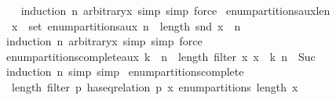 \begin{isabellebody}
%
\isadelimproof
\ \ %
\endisadelimproof
%
\isatagproof
{}\isamarkupfalse%
\ {\isacharparenleft}{\kern0pt}induction\ n\ arbitrary{\isacharcolon}{\kern0pt}x{\isacharcomma}{\kern0pt}\ simp{\isacharcomma}{\kern0pt}\ simp{\isacharcomma}{\kern0pt}\ force{\isacharparenright}{\kern0pt}%
\endisatagproof
{\isafoldproof}%
%
\isadelimproof
\isanewline
%
\endisadelimproof
\isanewline
{}\isamarkupfalse%
\ enum{\isacharunderscore}{\kern0pt}partitions{\isacharunderscore}{\kern0pt}aux{\isacharunderscore}{\kern0pt}len{\isacharcolon}{\kern0pt}\isanewline
\ \ {\isachardoublequoteopen}x\ {\isasymin}\ set\ {\isacharparenleft}{\kern0pt}enum{\isacharunderscore}{\kern0pt}partitions{\isacharunderscore}{\kern0pt}aux\ n{\isacharparenright}{\kern0pt}\ {\isasymLongrightarrow}\ length\ {\isacharparenleft}{\kern0pt}snd\ x{\isacharparenright}{\kern0pt}\ {\isacharequal}{\kern0pt}\ n{\isachardoublequoteclose}\isanewline
%
\isadelimproof
\ \ %
\endisadelimproof
%
\isatagproof
{}\isamarkupfalse%
\ {\isacharparenleft}{\kern0pt}induction\ n\ arbitrary{\isacharcolon}{\kern0pt}x{\isacharcomma}{\kern0pt}\ simp{\isacharcomma}{\kern0pt}\ simp{\isacharcomma}{\kern0pt}\ force{\isacharparenright}{\kern0pt}%
\endisatagproof
{\isafoldproof}%
%
\isadelimproof
\isanewline
%
\endisadelimproof
\isanewline
{}\isamarkupfalse%
\ enum{\isacharunderscore}{\kern0pt}partitions{\isacharunderscore}{\kern0pt}complete{\isacharunderscore}{\kern0pt}aux{\isacharcolon}{\kern0pt}\ {\isachardoublequoteopen}k\ {\isacharless}{\kern0pt}\ n\ {\isasymLongrightarrow}\ length\ {\isacharparenleft}{\kern0pt}filter\ {\isacharparenleft}{\kern0pt}{\isasymlambda}x{\isachardot}{\kern0pt}\ x\ {\isacharequal}{\kern0pt}\ k{\isacharparenright}{\kern0pt}\ {\isacharbrackleft}{\kern0pt}{}{\isachardot}{\kern0pt}{\isachardot}{\kern0pt}{\isacharless}{\kern0pt}n{\isacharbrackright}{\kern0pt}{\isacharparenright}{\kern0pt}\ {\isacharequal}{\kern0pt}\ Suc\ {}{\isachardoublequoteclose}\isanewline
%
\isadelimproof
\ \ %
\endisadelimproof
%
\isatagproof
{}\isamarkupfalse%
\ {\isacharparenleft}{\kern0pt}induction\ n{\isacharcomma}{\kern0pt}\ simp{\isacharcomma}{\kern0pt}\ simp{\isacharparenright}{\kern0pt}%
\endisatagproof
{\isafoldproof}%
%
\isadelimproof
\isanewline
%
\endisadelimproof
\isanewline
{}\isamarkupfalse%
\ enum{\isacharunderscore}{\kern0pt}partitions{\isacharunderscore}{\kern0pt}complete{\isacharcolon}{\kern0pt}\isanewline
\ \ {\isachardoublequoteopen}length\ {\isacharparenleft}{\kern0pt}filter\ {\isacharparenleft}{\kern0pt}{\isasymlambda}p{\isachardot}{\kern0pt}\ has{\isacharunderscore}{\kern0pt}eq{\isacharunderscore}{\kern0pt}relation\ p\ x{\isacharparenright}{\kern0pt}\ {\isacharparenleft}{\kern0pt}enum{\isacharunderscore}{\kern0pt}partitions\ {\isacharparenleft}{\kern0pt}length\ x{\isacharparenright}{\kern0pt}{\isacharparenright}{\kern0pt}{\isacharparenright}{\kern0pt}\ {\isacharequal}{\kern0pt}\ {}{\isachardoublequoteclose}\isanewline

\end{isabellebody}
